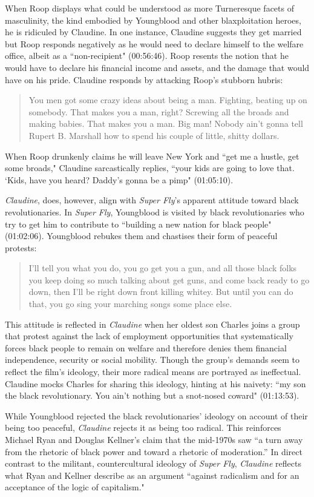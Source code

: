 When Roop displays what could be understood as more Turneresque facets of masculinity, the kind embodied by Youngblood and other blaxploitation heroes, he is ridiculed by Claudine.
In one instance, Claudine suggests they get married but Roop responds negatively as he would need to declare himself to the welfare office, albeit as a ``non-recipient" (00:56:46).
Roop resents the notion that he would have to declare his financial income and assets, and the damage that would have on his pride.
Claudine responds by attacking Roop's stubborn hubris:
\begin{quote}
You men got some crazy ideas about being a man. Fighting, beating up on somebody. That makes you a man, right? Screwing all the broads and making babies. That makes you a man. Big man! Nobody ain't gonna tell Rupert B. Marshall how to spend his couple of little, shitty dollars.
\end{quote}
When Roop drunkenly claims he will leave New York and ``get me a hustle, get some broads," Claudine sarcastically replies, ``your kids are going to love that. `Kids, have you heard? Daddy's gonna be a pimp" (01:05:10).

\textit{Claudine}, does, however, align with \textit{Super Fly}'s apparent attitude toward black revolutionaries.
In \textit{Super Fly}, Youngblood is visited by black revolutionaries who try to get him to contribute to ``building a new nation for black people" (01:02:06).
Youngblood rebukes them and chastises their form of peaceful protests:
\begin{quote}
I'll tell you what you do, you go get you a gun, and all those black folks you keep doing so much talking about get guns, and come back ready to go down, then I'll be right down front killing whitey. But until you can do that, you go sing your marching songs some place else.
\end{quote}
This attitude is reflected in \textit{Claudine} when her oldest son Charles joins a group that protest against the lack of employment opportunities that systematically forces black people to remain on welfare and therefore denies them financial independence, security or social mobility.
Though the group's demands seem to reflect the film's ideology, their more radical means are portrayed as ineffectual.
Claudine mocks Charles for sharing this ideology, hinting at his naivety: ``my son the black revolutionary. You ain't nothing but a snot-nosed coward" (01:13:53).

While Youngblood rejected the black revolutionaries' ideology on account of their being too peaceful, \textit{Claudine} rejects it as being too radical.
This reinforces Michael Ryan and Douglas Kellner’s claim that the mid-1970s saw ``a turn away from the rhetoric of black power and toward a rhetoric of moderation.”\autocite[][121]{ryan_camera_1988}
In direct contrast to the militant, countercultural ideology of \textit{Super Fly}, \textit{Claudine} reflects what Ryan and Kellner describe as an argument ``against radicalism and for an acceptance of the logic of capitalism."\autocite[][121]{ryan_camera_1988}

